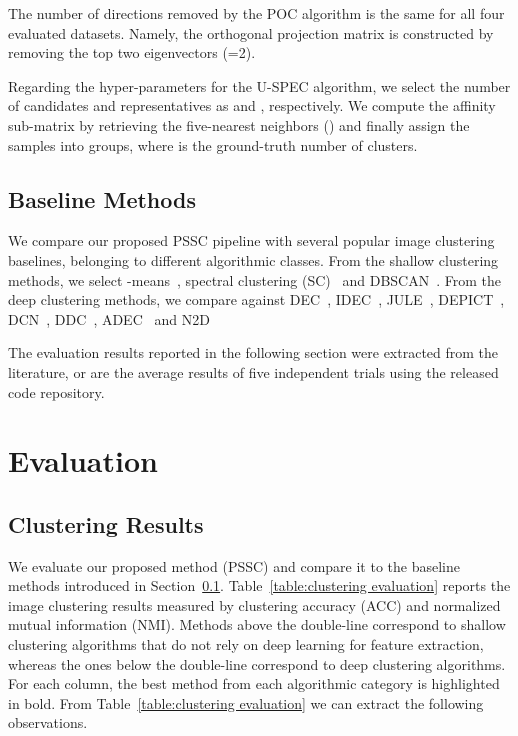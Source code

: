 \documentclass[11pt]{article}
\theoremstyle{definition}
\newcommand{\Table}[1]{Table~\ref{#1}}
\newcommand{\Section}[1]{Section~\ref{#1}}
\begin{document}
The number of directions removed by the POC algorithm is the same for all four evaluated datasets.
Namely, the orthogonal projection matrix  is constructed by removing the top two eigenvectors (=2).

Regarding the hyper-parameters for the U-SPEC algorithm, we select the number of candidates and representatives as  and , respectively. We compute the affinity sub-matrix by retrieving the five-nearest neighbors () and finally assign the samples into  groups, where  is the ground-truth number of clusters.


\subsection{Baseline Methods}\label{section: baseline methods}

We compare our proposed PSSC pipeline with several popular image clustering baselines, belonging to different algorithmic classes. From the shallow clustering methods, we select -means~\cite{Macqueen_KMeansClustering_1967}, spectral clustering (SC)~\cite{Ng_SpectralClustering_2002} and DBSCAN~\cite{Ester_DBSCANDensityBasedClustering_1996}. From the deep clustering methods, we compare against DEC~\cite{Xie_UnsupervisedDeepEmbeddingClustering_2016}, IDEC~\cite{Guo_ImprovedDeepEmbeddedClustering_2017}, JULE~\cite{Yang_JointUnsupervisedLearningImageClusters_2016joint}, 
DEPICT~\cite{Ghasedi_DEPICTDeepClusteringJointConvolutionalAutoencoderAndRelativeEntropyMinimization_2017},
DCN~\cite{Yang_TowrdsKMeansFriendlySpacesDeepClustering_2017},
DDC~\cite{Ren_DeepDensityBasedClustering_2020}, ADEC~\cite{Mrabah_AdversarialDeepEmbeddedClustering_2020} and 
N2D~\cite{Mcconville_DeepClusteringManifoldAutoencodedEmbedding_2019}


The evaluation results reported in the following section were extracted from the literature, or are the average results of five independent trials using the released code repository.



\section{Evaluation}\label{sec:evaluation}


\subsection{Clustering Results}

We evaluate our proposed method (PSSC) and compare it to the baseline methods introduced in \Section{section: baseline methods}. \Table{table:clustering evaluation} reports the image clustering results measured by clustering accuracy (ACC) and normalized mutual information (NMI). Methods above the double-line correspond to shallow clustering algorithms that do not rely on deep learning for feature extraction, whereas the ones below the double-line correspond to deep clustering algorithms. For each column, the best method from each algorithmic category is highlighted in bold.
From \Table{table:clustering evaluation} we can extract the following observations.
\end{document}
